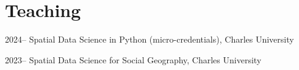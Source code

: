 \documentclass[11pt,a4paper]{report}
\begin{document}



    \section*{Teaching}

    \begin{tablist}

        \item[2024--] \tab{}Spatial Data Science in Python (micro-credentials), Charles University
        \item[2023--] \tab{}Spatial Data Science for Social Geography, Charles University
    \end{tablist}




\end{document}
